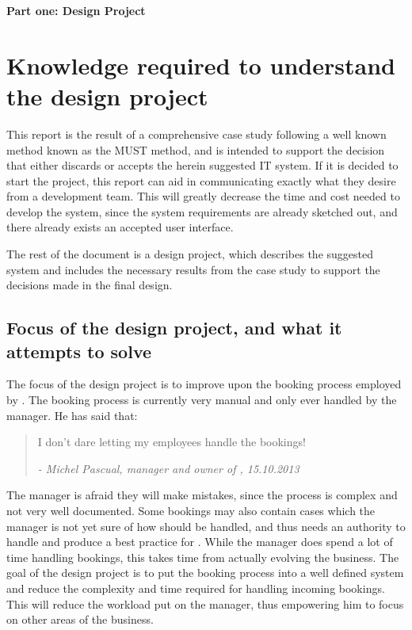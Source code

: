

\textbf{\LARGE{Part one: Design Project}}


\section{Knowledge required to understand the design project}
This report is the result of a comprehensive case study following a well known 
method known as the MUST method, and is intended to 
support the decision that either discards or accepts the herein suggested IT 
system. If it is decided to start the project, this report can aid \gomonkey{} in
communicating exactly what they desire from a development team. This will 
greatly decrease the time and cost needed to develop the system, since the system requirements
are already sketched out, and there already exists an accepted user interface.

The rest of the document is a design project, which describes the suggested system
and includes the necessary results from the case study to support the decisions
made in the final design.

\subsection{Focus of the design project, and what it attempts to solve}
The focus of the design project is to improve upon the booking process employed by 
\gomonkey. The booking process is currently very manual and only ever handled by 
the manager. He has said that: 

\begin{quotation}
I don't dare letting my employees handle the bookings!

\em - Michel Pascual, manager and owner of \gomonkey{}, 15.10.2013
\end{quotation}

The manager is afraid they will make mistakes, since the process is complex and not very 
well documented. Some bookings may also contain cases which the manager is not 
yet sure of how should be handled, and thus needs an authority to handle and  
produce a best practice for \gomonkey{}. While the manager does spend a lot of
time handling bookings, this takes time from actually evolving the business.
The goal of the design project is to put the booking process into a 
well defined system and reduce the complexity and time required for handling
incoming bookings. This will reduce the workload put on the manager, thus 
empowering him to focus on other areas of the business.


